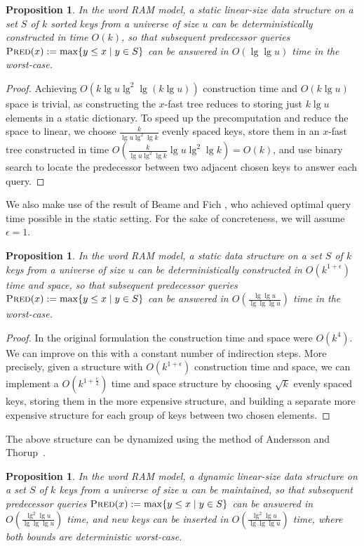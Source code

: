 \documentclass[11pt,onecolumn,final]{article} \usepackage{a4}
\theoremstyle{plain}
\newtheorem{prop}[definition]{Proposition}
\theoremstyle{remark}
\begin{document}
\begin{prop}
  \label{thm:predecessor}
In the word RAM model, a static linear-size data structure on a set $S$ of $k$ sorted keys from a universe of size $u$ can be deterministically constructed in time $O(k)$, so that subsequent \emph{predecessor queries} $\textsc{Pred}(x) := \max\{y\le x\mid y\in S\}$ can be answered in $O(\lg\lg u)$ time in the worst-case.
\end{prop}

\begin{proof}
Achieving $O(k\lg u\lg^{2}\lg (k\lg u))$ construction time and $O(k\lg u)$ space is trivial, as constructing the $x$-fast tree reduces to storing just $k\lg u$ elements in a static dictionary. To speed up the precomputation and reduce the space to linear, we choose $\frac{k}{\lg u\lg^{2}\lg k}$ evenly spaced keys, store them in an $x$-fast tree constructed in time $O(\frac{k}{\lg u\lg^{2}\lg k}\lg u\lg^{2}\lg k)=O(k)$, and use binary search to locate the predecessor between two adjacent chosen keys to answer each query.
\end{proof}

We also make use of the result of Beame and Fich \cite[Theorem~3]{beame02predecessor}, who achieved optimal query time possible in the static setting. For the sake of concreteness, we will assume $\epsilon=1$.

\begin{prop}
\label{thm:predecessor2}
In the word RAM model, a static data structure on a set $S$ of $k$ keys from a universe of size $u$ can be deterministically constructed in $O(k^{1+\epsilon})$ time and space, so that subsequent \emph{predecessor queries} $\textsc{Pred}(x) := \max\{y\le x\mid y\in S\}$ can be answered in $O(\frac{\lg\lg u}{\lg\lg\lg u})$ time in the worst-case.
\end{prop}

\begin{proof}
In the original formulation the construction time and space were $O(k^{4})$. We can improve on this with a constant number of indirection steps. More precisely, given a structure with $O(k^{1+\epsilon})$ construction time and space, we can implement a $O(k^{1+\frac{\epsilon}{2}})$ time and space structure by choosing $\sqrt{k}$ evenly spaced keys, storing them in the more expensive structure, and building a separate more expensive structure for each group of keys between two chosen elements.
\end{proof}

The above structure can be dynamized using the method of Andersson and Thorup~\cite{andersson07dynamic}.
\begin{prop}
\label{thm:predecessor3}
In the word RAM model, a dynamic linear-size data structure on a set $S$ of $k$ keys from a universe of size $u$ can be maintained, so that subsequent \emph{predecessor queries} $\textsc{Pred}(x) := \max\{y\le x\mid y\in S\}$ can be answered in $O(\frac{\lg^{2}\lg u}{\lg\lg\lg u})$ time, and new keys can be inserted in $O(\frac{\lg^{2}\lg u}{\lg\lg\lg u})$ time, where both bounds are deterministic  worst-case.
\end{prop}
\end{document}
